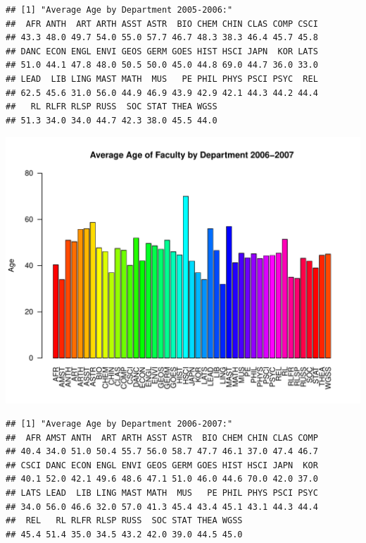 \documentclass[12pt,a4paper]{article}\usepackage[]{graphicx}\usepackage[]{color}
\makeatletter
\def\maxwidth{ %
  \ifdim\Gin@nat@width>\linewidth
    \linewidth
  \else
    \Gin@nat@width
  \fi
}
\newenvironment{kframe}{%
 \def\at@end@of@kframe{}%
 \ifinner\ifhmode%
  \def\at@end@of@kframe{\end{minipage}}%
  \begin{minipage}{\columnwidth}%
 \fi\fi%
 \def\FrameCommand##1{\hskip\@totalleftmargin \hskip-\fboxsep
 \colorbox{shadecolor}{##1}\hskip-\fboxsep
     \hskip-\linewidth \hskip-\@totalleftmargin \hskip\columnwidth}%
 \MakeFramed {\advance\hsize-\width
   \@totalleftmargin\z@ \linewidth\hsize
   \@setminipage}}%
 {\par\unskip\endMakeFramed%
 \at@end@of@kframe}
\newenvironment{knitrout}{}{} %
\theoremstyle{definition}
\makeatother
\begin{document}
\begin{knitrout}
\begin{kframe}\begin{verbatim}
## [1] "Average Age by Department 2005-2006:"
##  AFR ANTH  ART ARTH ASST ASTR  BIO CHEM CHIN CLAS COMP CSCI 
## 43.3 48.0 49.7 54.0 55.0 57.7 46.7 48.3 38.3 46.4 45.7 45.8 
## DANC ECON ENGL ENVI GEOS GERM GOES HIST HSCI JAPN  KOR LATS 
## 51.0 44.1 47.8 48.0 50.5 50.0 45.0 44.8 69.0 44.7 36.0 33.0 
## LEAD  LIB LING MAST MATH  MUS   PE PHIL PHYS PSCI PSYC  REL 
## 62.5 45.6 31.0 56.0 44.9 46.9 43.9 42.9 42.1 44.3 44.2 44.4 
##   RL RLFR RLSP RUSS  SOC STAT THEA WGSS 
## 51.3 34.0 34.0 44.7 42.3 38.0 45.5 44.0
\end{verbatim}
\end{kframe}
\includegraphics[width=\maxwidth]{figure/unnamed-chunk-10-3} 
\begin{kframe}\begin{verbatim}
## [1] "Average Age by Department 2006-2007:"
##  AFR AMST ANTH  ART ARTH ASST ASTR  BIO CHEM CHIN CLAS COMP 
## 40.4 34.0 51.0 50.4 55.7 56.0 58.7 47.7 46.1 37.0 47.4 46.7 
## CSCI DANC ECON ENGL ENVI GEOS GERM GOES HIST HSCI JAPN  KOR 
## 40.1 52.0 42.1 49.6 48.6 47.1 51.0 46.0 44.6 70.0 42.0 37.0 
## LATS LEAD  LIB LING MAST MATH  MUS   PE PHIL PHYS PSCI PSYC 
## 34.0 56.0 46.6 32.0 57.0 41.3 45.4 43.4 45.1 43.1 44.3 44.4 
##  REL   RL RLFR RLSP RUSS  SOC STAT THEA WGSS 
## 45.4 51.4 35.0 34.5 43.2 42.0 39.0 44.5 45.0
\end{verbatim}
\end{kframe}

\end{knitrout}
\end{document}
